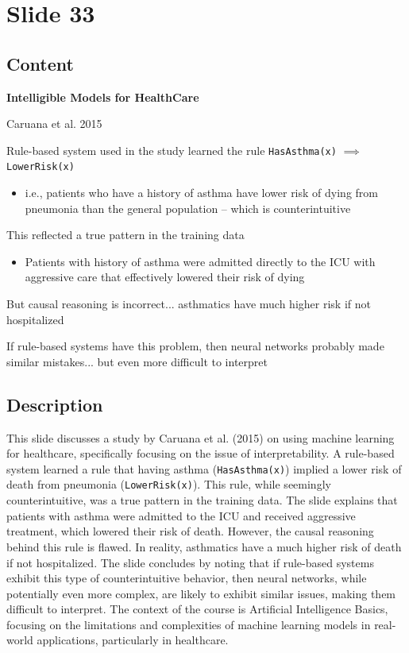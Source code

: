 \documentclass{article}%
\begin{document}
%
\newpage%
\section{Slide 33}%
\label{sec:Slide33}%
\subsection{Content}%

\textbf{Intelligible Models for HealthCare}

Caruana et al. 2015

Rule-based system used in the study learned the
rule \texttt{HasAsthma(x)} $\implies$ \texttt{LowerRisk(x)}

\begin{itemize}
    \item i.e., patients who have a history of asthma have
    lower risk of dying from pneumonia than the
    general population -- which is counterintuitive
\end{itemize}

This reflected a true pattern in the training data

\begin{itemize}
    \item Patients with history of asthma were admitted
    directly to the ICU with aggressive care that
    effectively lowered their risk of dying
\end{itemize}

But causal reasoning is incorrect... asthmatics have
much higher risk if not hospitalized

If rule-based systems have this problem,
then neural networks probably made similar
mistakes... but even more difficult to interpret
%
\subsection{Description}%
This slide discusses a study by Caruana et al. (2015) on using machine learning for healthcare, specifically focusing on the issue of interpretability.  A rule-based system learned a rule that having asthma (\texttt{HasAsthma(x)}) implied a lower risk of death from pneumonia (\texttt{LowerRisk(x)}).  This rule, while seemingly counterintuitive, was a true pattern in the training data.  The slide explains that patients with asthma were admitted to the ICU and received aggressive treatment, which lowered their risk of death.  However, the causal reasoning behind this rule is flawed.  In reality, asthmatics have a much higher risk of death if not hospitalized.  The slide concludes by noting that if rule-based systems exhibit this type of counterintuitive behavior, then neural networks, while potentially even more complex, are likely to exhibit similar issues, making them difficult to interpret. The context of the course is Artificial Intelligence Basics, focusing on the limitations and complexities of machine learning models in real-world applications, particularly in healthcare.%
\end{document}

